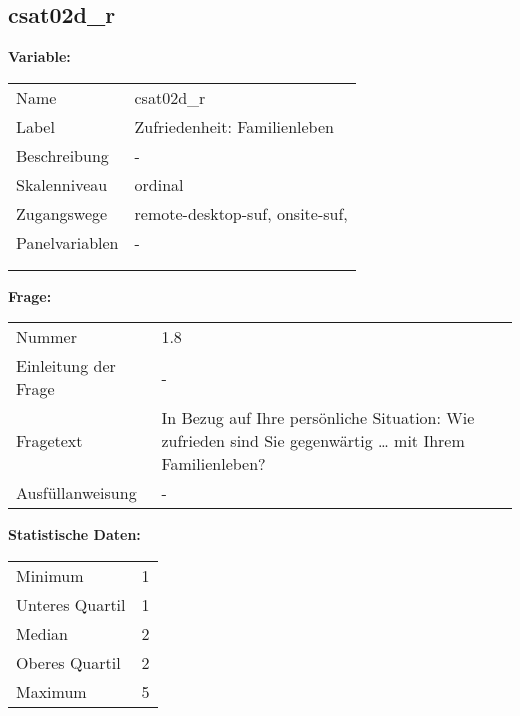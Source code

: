 	
	
	\subsection{csat02d\_r}
	\label{subSection:csat02d_r}

	\noindent\textbf{Variable:}\\
		\begin{tabular}{lL{11.3cm}}
			\label{tableVariable:csat02d_r}
			Name & csat02d\_r \\
			Label & Zufriedenheit: Familienleben \\
			Beschreibung & - \\
			Skalenniveau & ordinal \\
			Zugangswege &
				remote-desktop-suf,
				onsite-suf,
 \\
			Panelvariablen & -
			 \\
			 \\
 \\
		\end{tabular}

		\vspace*{1 cm}
		\noindent\textbf{Frage:}\\
		\begin{tabular}{lL{11.3cm}}
			\label{tableQuestion:csat02d_r}
			Nummer & 1.8 \\
			Einleitung der Frage & - \\
			Fragetext & In Bezug auf Ihre persönliche Situation: Wie zufrieden sind Sie gegenwärtig …
mit Ihrem Familienleben? \\
			Ausfüllanweisung & - \\
		\end{tabular}


		\vspace*{1 cm}
		\noindent\textbf{Statistische Daten:}\\
			\begin{tabular}{ll}
				\label{tableStatistics:csat02d_r}
					Minimum & 1 \\
					Unteres Quartil & 1 \\
					Median & 2 \\
					Oberes Quartil & 2 \\
					Maximum & 5 \\
			\end{tabular}



